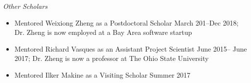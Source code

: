 
\textit{Other Scholars}
\begin{itemize}
\item Mentored Weixiong Zheng as a Postdoctoral Scholar March 201--Dec 2018; Dr. Zheng is now employed at a Bay Area software startup 
\item Mentored Richard Vasques as an Assistant Project Scientist June 2015-- June 2017; Dr. Zheng is now a professor at The Ohio State University
\item Mentored Ilker Makine as a Visiting Scholar Summer 2017
\end{itemize}

